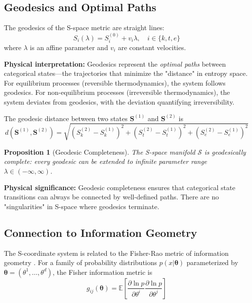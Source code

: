 \documentclass[twocolumn,10pt]{article}
\newtheorem{proposition}[theorem]{Proposition}
\theoremstyle{remark}
\begin{document}
\subsection{Geodesics and Optimal Paths}

The geodesics of the S-space metric are straight lines:
\begin{equation}
    S_i(\lambda) = S_i^{(0)} + v_i \lambda, \quad i \in \{k, t, e\}
    \label{eq:geodesic}
\end{equation}
where $\lambda$ is an affine parameter and $v_i$ are constant velocities.

\textbf{Physical interpretation:} Geodesics represent the \textit{optimal paths} between categorical states—the trajectories that minimize the "distance" in entropy space. For equilibrium processes (reversible thermodynamics), the system follows geodesics. For non-equilibrium processes (irreversible thermodynamics), the system deviates from geodesics, with the deviation quantifying irreversibility.

The geodesic distance between two states $\mathbf{S}^{(1)}$ and $\mathbf{S}^{(2)}$ is
\begin{equation}
    d(\mathbf{S}^{(1)}, \mathbf{S}^{(2)}) = \sqrt{(S_k^{(2)} - S_k^{(1)})^2 + (S_t^{(2)} - S_t^{(1)})^2 + (S_e^{(2)} - S_e^{(1)})^2}
    \label{eq:geodesic_distance}
\end{equation}

\begin{proposition}[Geodesic Completeness]
\label{prop:geodesic_completeness}
The S-space manifold $\mathcal{S}$ is geodesically complete: every geodesic can be extended to infinite parameter range $\lambda \in (-\infty, \infty)$.
\end{proposition}

\textbf{Physical significance:} Geodesic completeness ensures that categorical state transitions can always be connected by well-defined paths. There are no "singularities" in S-space where geodesics terminate.

\subsection{Connection to Information Geometry}

The S-coordinate system is related to the Fisher-Rao metric of information geometry \cite{amari2016}. For a family of probability distributions $p(x|\boldsymbol{\theta})$ parameterized by $\boldsymbol{\theta} = (\theta^1, \ldots, \theta^d)$, the Fisher information metric is
\begin{equation}
    g_{ij}(\boldsymbol{\theta}) = \mathbb{E}\left[\frac{\partial \ln p}{\partial \theta^i} \frac{\partial \ln p}{\partial \theta^j}\right]
    \label{eq:fisher_metric}
\end{equation}
\end{document}
